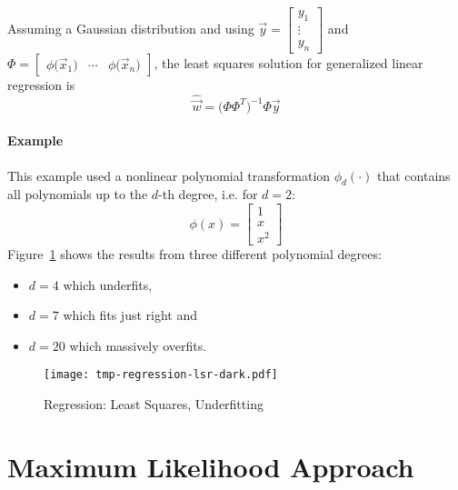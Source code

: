 		Assuming a Gaussian distribution and using \( \vec{y} = \begin{bmatrix} y_1 \\ \vdots \\ y_n \end{bmatrix} \) and \( \Phi = \begin{bmatrix} \phi\big(\vec{x}_1\big) & \cdots & \phi\big(\vec{x}_n\big) \end{bmatrix} \), the least squares solution for generalized linear regression is
		\begin{equation}
			\hat{\vec{w}} = \big( \Phi \Phi^T \big)^{-1} \Phi \vec{y}
		\end{equation}
		
		\paragraph{Example}
			This example used a nonlinear polynomial transformation \( \phi_d(\cdot) \) that contains all polynomials up to the \(d\)-th degree, i.e. for \( d = 2 \):
			\begin{equation}
				\phi(x) =
					\begin{bmatrix}
						1 \\
						x \\
						x^2
					\end{bmatrix}
			\end{equation}
			Figure~\ref{fig:regressionLsr} shows the results from three different polynomial degrees:
			\begin{itemize}
				\item \(d = 4\) which underfits,
				\item \(d = 7\) which fits just right and
				\item \(d = 20\) which massively overfits.
			\end{itemize}
		
			\begin{figure}
				\centering
				\texttt{[image: tmp-regression-lsr-dark.pdf]}
				\caption{Regression: Least Squares, Underfitting}
				\label{fig:regressionLsr}
			\end{figure}

	\section{Maximum Likelihood Approach}
